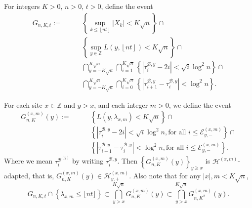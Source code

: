 \documentclass[twoside,12pt, a4paper]{article}
\numberwithin{equation}{section}
\theoremstyle{remark}
\newcommand{\abs}[1]{\left\vert #1 \right\vert}
\begin{document}
		For integers $K>0$, $n > 0$, $t>0$, define the event
\begin{align}
	G_{n,K,t} :=  \qquad
		\label{eqn:good-event-1}
		& \left\{\sup _{k \le \left\lfloor nt  \right\rfloor} |X_k| < K \sqrt{n} \right\} \cap \\
		\label{eqn:good-event-2}
		& \left\{\sup_{y \in \mathbb{Z}} L(y, \left\lfloor nt  \right\rfloor) < K \sqrt{n} \right\} \cap \\
		\label{eqn:good-event-3}
		& \bigcap_{y = - K \sqrt{n} }^{K \sqrt{n}} 
		\bigcap_{i = 1}^{K \sqrt{n} } \left\{\left| \tau_i^{\mathcal{B},y} - 2 i \right| < \sqrt{ i } \log^2 n \right\}  \cap \\
		\label{eqn:good-event-4}
		& \bigcap_{y = - K \sqrt{n} }^{K \sqrt{n}} 
		\bigcap_{i = 0}^{K \sqrt{n} } \left\{\left| \tau_{i+1}^{\mathcal{B},y} - \tau_i^{\mathcal{B},y} \right| < \log^2 n \right\}  
		.\end{align}
	
	For each site $x \in \mathbb{Z}$ and $y > x$, and each integer $m > 0$, we define the event
	\begin{align}
		G_{n,K}^{(x,m)}(y) :=  \qquad
		& \left\{L(y,\lambda_{x,m})  < K \sqrt{n} \right\} \cap \\
		& \left\{\left| \tau_i^{\mathcal{B}, y} - 2 i \right| < \sqrt{ i } \log^2 n, \mbox{for all $i\leq  \mathcal{E}_{y,-}^{(x,m)}$} \right\}  \cap \\
		& \left\{\left| \tau_{i+1}^{\mathcal{B},y} - \tau_i^{\mathcal{B},y} \right| < \log^2 n,  \mbox{for all $i\leq  \mathcal{E}_{y,-}^{(x,m)}$}  \right\}  
		.\end{align}
	Where we mean $\tau_i^{\mathcal{B}^{(y)}}$ by writing $\tau_i^{\mathcal{B}, y}$.
	Then  $\left\{G_{n, K}^{(x,m)}(y)\right\}_{y \ge x}$ is $\mathcal{H}^{(x,m)}$-adapted, that is, $G_{n, K}^{(x,m)}(y)\in \mathcal{H}_{y, +}^{(x,m)}$.
	Also note that for any $ \abs{x},m < K\sqrt{n}$, 
	\begin{equation}
		\label{eqn:goodgood}
		G_{n, K, t}\cap \left\{ \lambda_{x,m} \leq\lfloor nt \rfloor \right\} \subset   \bigcap_{y>x}^{K\sqrt{n}} G_{n, K}^{(x,m)}(y) \subset   \bigcap_{y>x}^{K\sqrt{n}} G_{n, K^2}^{(x,m)}(y)
		.\end{equation} 
	
\end{document}
